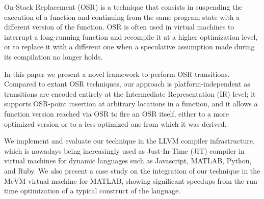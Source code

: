 On-Stack Replacement (OSR) is a technique that consists in suspending the execution of a function and continuing from the same program state with a different version of the function. OSR is often used in virtual machines to interrupt a long-running function and recompile it at a higher optimization level, or to replace it with a different one when a speculative assumption made during its compilation no longer holds.

In this paper we present a novel framework to perform OSR transitions. Compared to extant OSR techniques, our approach is platform-independent as transitions are encoded entirely at the Intermediate Representation (IR) level; it supports OSR-point insertion at arbitrary locations in a function, and it allows a function version reached via OSR to fire an OSR itself, either to a more optimized version or to a less optimized one from which it was derived.

We implement and evaluate our technique in the LLVM compiler infrastructure, which is nowadays being increasingly used as Just-In-Time (JIT) compiler in virtual machines for dynamic languages such as Javascript, MATLAB, Python, and Ruby. We also present a case study on the integration of our technique in the McVM virtual machine for MATLAB, showing significant speedups from the run-time optimization of a typical construct of the language.
  
  
  
  
  
  
  
  
  
